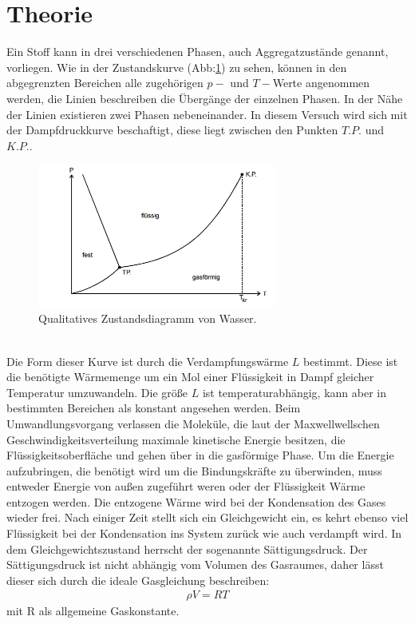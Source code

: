 \section{Theorie}
\label{sec:Theorie}

Ein Stoff kann in drei verschiedenen Phasen, auch Aggregatzustände genannt, vorliegen.
Wie in der Zustandskurve (Abb:\ref{fig:zustand}) zu sehen, können in den abgegrenzten
Bereichen alle zugehörigen $p-$ und $T-$Werte angenommen werden, die Linien
beschreiben die Übergänge der einzelnen Phasen. In der Nähe der Linien existieren zwei
Phasen nebeneinander. In diesem Versuch wird sich mit der Dampfdruckkurve beschaftigt, diese
liegt zwischen den Punkten $T.P.$ und $K.P.$.
\begin{figure}
 \centering
 \includegraphics[width=0.7\textwidth]{zustand.png}
 \caption{Qualitatives Zustandsdiagramm von Wasser.}
 \label{fig:zustand}
 \end{figure}\\
 Die Form dieser Kurve ist durch die Verdampfungswärme $L$ bestimmt. Diese ist die benötigte Wärmemenge
 um ein Mol einer Flüssigkeit in Dampf gleicher Temperatur umzuwandeln. Die größe $L$ ist
 temperaturabhängig, kann aber in bestimmten Bereichen als konstant angesehen werden.
 Beim Umwandlungsvorgang verlassen die Moleküle, die laut der Maxwellwellschen
 Geschwindigkeitsverteilung maximale kinetische Energie besitzen, die Flüssigkeitsoberfläche
 und gehen über in die gasförmige Phase. Um die Energie aufzubringen, die benötigt wird um
 die Bindungskräfte zu überwinden, muss entweder Energie von außen zugeführt weren oder
 der Flüssigkeit Wärme entzogen werden. Die entzogene Wärme wird bei der Kondensation des
 Gases wieder frei. Nach einiger Zeit stellt sich ein Gleichgewicht ein, es kehrt ebenso
 viel Flüssigkeit bei der Kondensation ins System zurück wie auch verdampft wird.
 In dem Gleichgewichtszustand herrscht der sogenannte Sättigungsdruck.
 Der Sättigungsdruck ist nicht abhängig vom Volumen des Gasraumes, daher lässt dieser sich durch
 die ideale Gasgleichung beschreiben:
 \begin{align}
 \rho V =RT
 \end{align}
 mit R als allgemeine Gaskonstante.
